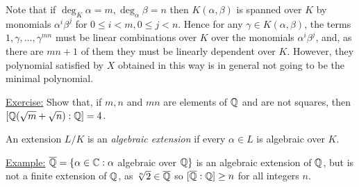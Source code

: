 \documentclass[a4paper, 10pt, twocolumn]{amsart}
\begin{document}
Note that if $\deg_K \alpha = m, \deg_\alpha \beta = n$ then $K(\alpha,\beta)$ is spanned over $K$ by monomials $\alpha^i\beta^j$ for $0\leq i < m, 0\leq j < n$. Hence for any $\gamma \in K(\alpha, \beta)$, the terms $1,\gamma,\ldots,\gamma^{mn}$ must be linear combinations over $K$ over the monomials $\alpha^i \beta^j$, and, as there are $mn+1$ of them they must be linearly dependent over $K$. However, they polynomial satisfied by $X$ obtained in this way is in general not going to be the minimal polynomial.

\underline{Exercise:} Show that, if $m,n$ and $mn$ are elements of $\mathbb{Q}$ and are not squares, then $[\mathbb{Q}(\sqrt{m}+\sqrt{n}):\mathbb{Q}] = 4$.

An extension $L/K$ is an \emph{algebraic extension} if every $\alpha \in L$ is algebraic over $K$.

\underline{Example:} $\overline{\mathbb{Q}} = \{\alpha \in \mathbb{C}: \alpha$ algebraic over $\mathbb{Q}\}$ is an algebraic extension of $\mathbb{Q}$, but is not a finite extension of $\mathbb{Q}$, as $\sqrt[n]{2} \in \overline{\mathbb{Q}}$ so $[\overline{\mathbb{Q}}:\mathbb{Q}] \geq n$ for all integers $n$.
\end{document}
